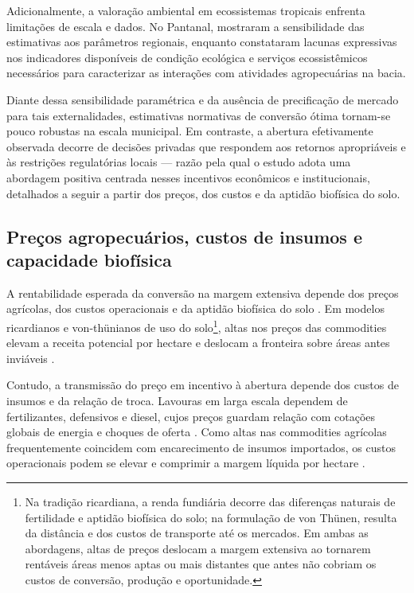 Adicionalmente, a valoração ambiental em ecossistemas tropicais enfrenta limitações de escala e dados. No Pantanal,  mostraram a sensibilidade das estimativas aos parâmetros regionais, enquanto  constataram lacunas expressivas nos indicadores disponíveis de condição ecológica e serviços ecossistêmicos necessários para caracterizar as interações com atividades agropecuárias na bacia. 

Diante dessa sensibilidade paramétrica e da ausência de precificação de mercado para tais externalidades, estimativas normativas de conversão ótima tornam-se pouco robustas na escala municipal. Em contraste, a abertura efetivamente observada decorre de decisões privadas que respondem aos retornos apropriáveis e às restrições regulatórias locais — razão pela qual o estudo adota uma abordagem positiva centrada nesses incentivos econômicos e institucionais, detalhados a seguir a partir dos preços, dos custos e da aptidão biofísica do solo.

\subsection{Preços agropecuários, custos de insumos e capacidade biofísica}
\label{literatura-precos}

A rentabilidade esperada da conversão na margem extensiva depende dos preços agrícolas, dos custos operacionais e da aptidão biofísica do solo \cite{Angelsen2010, LubowskiEtAl2008}. Em modelos ricardianos e von-thünianos de uso do solo\footnote{Na tradição ricardiana, a renda fundiária decorre das diferenças naturais de fertilidade e aptidão biofísica do solo; na formulação de von Thünen, resulta da distância e dos custos de transporte até os mercados. Em ambas as abordagens, altas de preços deslocam a margem extensiva ao tornarem rentáveis áreas menos aptas ou mais distantes que antes não cobriam os custos de conversão, produção e oportunidade.}, altas nos preços das commodities elevam a receita potencial por hectare e deslocam a fronteira sobre áreas antes inviáveis \cite{Pfaff1999, ChomitzThomas2003}.

Contudo, a transmissão do preço em incentivo à abertura depende dos custos de insumos e da relação de troca. Lavouras em larga escala dependem de fertilizantes, defensivos e diesel, cujos preços guardam relação com cotações globais de energia e choques de oferta \cite{BaffesHaniotis2010}. Como altas nas commodities agrícolas frequentemente coincidem com encarecimento de insumos importados, os custos operacionais podem se elevar e comprimir a margem líquida por hectare \cite{IMEA2026, CONAB2026}.

